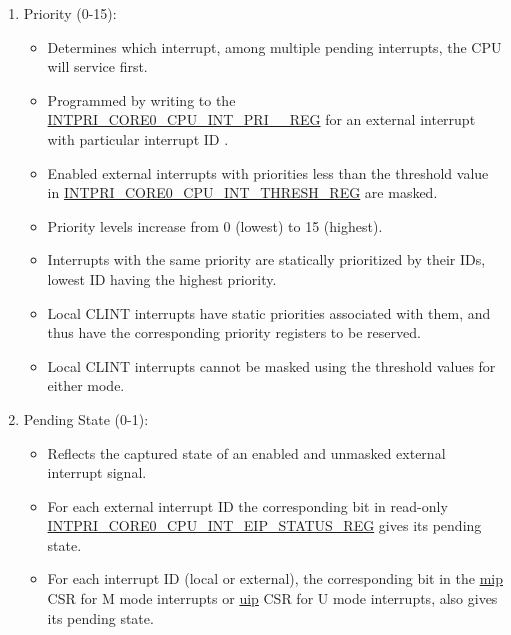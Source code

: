 \documentclass[main\_\_EN.tex]{subfiles}
\begin{document}
\begin{enumerate}
\begin{itemize}
        \item An interrupt for which type is kept 0 is referred to as a 'level' type interrupt.
        \item An interrupt for which type is set to 1 is referred to as an 'edge' type interrupt.
        \item Local CLINT interrupts are always 'level' type and thus have the corresponding bits reserved in the above register.
    \end{itemize}
    \item Priority (0-15):
    \begin{itemize}
        \item Determines which interrupt, among multiple pending interrupts, the CPU will service first.
        \item Programmed by writing to the \hyperref[regdesc:INTPRICORE0CPUINTPRINREG]{INTPRI\_CORE0\_CPU\_INT\_PRI\_\_REG} for an external interrupt with particular interrupt ID .
        \item Enabled external interrupts with priorities less than the threshold value in \hyperref[regdesc:INTPRICORE0CPUINTTHRESHREG]{INTPRI\_CORE0\_CPU\_INT\_THRESH\_REG} are masked.
        \item Priority levels increase from 0 (lowest) to 15 (highest).
        \item Interrupts with the same priority are statically prioritized by their IDs, lowest ID having the highest priority.
        \item Local CLINT interrupts have static priorities associated with them, and thus have the corresponding priority registers to be reserved.
        \item Local CLINT interrupts cannot be masked using the threshold values for either mode.
    \end{itemize}
    \item Pending State (0-1):
    \begin{itemize}
        \item Reflects the captured state of an enabled and unmasked external interrupt signal.
        \item For each external interrupt ID the corresponding bit in read-only \hyperref[regdesc:INTPRICORE0CPUINTEIPSTATUSREG]{INTPRI\_CORE0\_CPU\_INT\_EIP\_STATUS\_REG} gives its pending state.
        \item For each interrupt ID (local or external), the corresponding bit in the \hyperref[regdesc:MIP]{mip} CSR for M mode interrupts or \hyperref[regdesc:UIP]{uip} CSR for U mode interrupts, also gives its pending state.

\end{itemize}
\end{enumerate}
\end{document}

